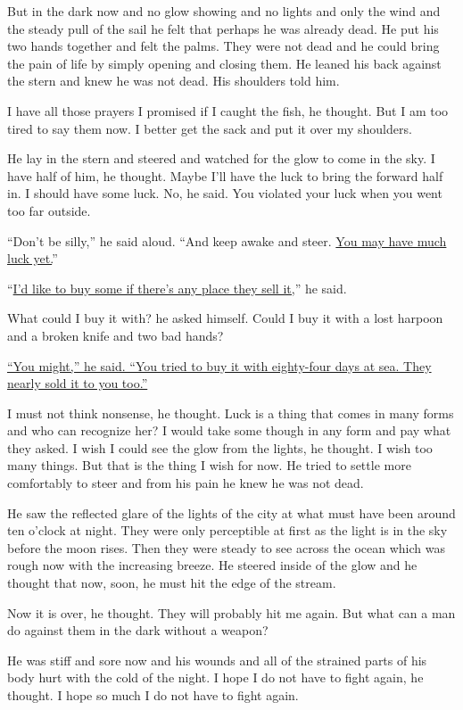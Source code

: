 But in the dark now and no glow showing and no lights and only the wind and
the steady pull of the sail he felt that perhaps he was already dead. He put
his two hands together and felt the palms. They were not dead and he could
bring the pain of life by simply opening and closing them. He leaned his
back against the stern and knew he was not dead. His shoulders told him.

I have all those prayers I promised if I caught the fish, he thought. But I
am too tired to say them now. I better get the sack and put it over my
shoulders.

He lay in the stern and steered and watched for the glow to come in the
sky. I have half of him, he thought. Maybe I'll have the luck to bring the
forward half in. I should have some luck. No, he said. You \gls{violated} your
luck when you went too far outside.

``Don't be silly,'' he said aloud. ``And keep awake and steer. \uline{You may have
much luck yet.}''

``\uline{I'd like to buy some if there's any place they sell it,}'' he said.

What could I buy it with? he asked himself. Could I buy it with a lost
harpoon and a broken knife and two bad hands?

\uline{``You might,'' he said. ``You tried to buy it with eighty-four days at sea.
They nearly sold it to you too.''}

I must not think nonsense, he thought. Luck is a thing that comes in many
forms and who can \gls{recognize} her? I would take some though in any form
and pay what they asked. I wish I could see the glow from the lights, he
thought. I wish too many things. But that is the thing I wish for now. He
tried to settle more comfortably to steer and from his pain he knew he was
not dead.

He saw the \gls{reflected} glare of the lights of the city at what must have
been around ten o'clock at night. They were only \gls{perceptible} at first
as the light is in the sky before the moon rises. Then they were steady to
see across the ocean which was rough now with the increasing breeze. He
steered inside of the glow and he thought that now, soon, he must hit the
edge of the stream.

Now it is over, he thought. They will probably hit me again. But what can a
man do against them in the dark without a weapon?

He was stiff and sore now and his wounds and all of the \gls{strained}
parts of his body hurt with the cold of the night. I hope I do not have to
fight again, he thought. I hope so much I do not have to fight again.

